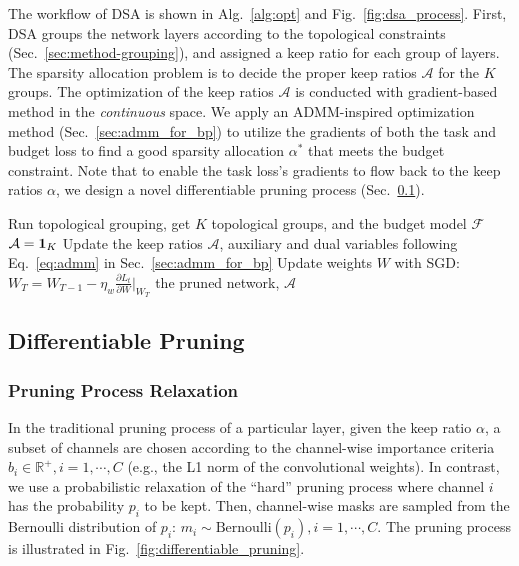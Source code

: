 \documentclass[runningheads]{llncs}
\newcommand{\flops}{\mathcal{F}}
\newcommand{\alphas}{\mathcal{A}}
\newcommand{\dsa}{DSA\xspace}
\begin{document}
  The workflow of \dsa is shown in Alg.~\ref{alg:opt} and Fig.~\ref{fig:dsa_process}. 
  First, \dsa groups the network layers according to the topological constraints (Sec.~\ref{sec:method-grouping}), and assigned a keep ratio for each group of layers. The sparsity allocation problem is to decide the proper keep ratios $\alphas$ for the $K$ groups.
  The optimization of the keep ratios $\alphas$ is conducted with gradient-based method in the \emph{continuous} space. 
  We apply an ADMM-inspired optimization method (Sec.~\ref{sec:admm_for_bp}) to utilize the gradients of both the task and budget loss to find a good sparsity allocation $\alpha^*$ that meets the budget constraint.
  Note that to enable the task loss's gradients to flow back to the keep ratios $\alpha$, we design a novel differentiable pruning process (Sec.~\ref{sec:method-pruning}).
  
  
  
  
  
  \begin{algorithm}[t]
    \begin{algorithmic}[1]
      \STATE Run topological grouping, get $K$ topological groups, and the budget model $\flops$
    \STATE $\alphas = {\bf 1}_{K}$
  \WHILE{$\flops(\alphas) > B_{\flops}$}
  \STATE Update the keep ratios $\alphas$, auxiliary and dual variables following Eq.~\ref{eq:admm} in Sec.~\ref{sec:admm_for_bp} 
  \STATE Update weights $W$ with SGD:\\ $W_{T} = W_{T-1} - \eta_w \frac{\partial L_t}{\partial W}|_{W_T}$
  \ENDWHILE
  \RETURN the pruned network, $\alphas$
  \end{algorithmic}
  \caption{\dsa: Differentiable sparsity allocation}
  \label{alg:opt}
  \end{algorithm}
  
  
  
  
  
  \subsection{Differentiable Pruning}
  \label{sec:method-pruning}
  
  \subsubsection{Pruning Process Relaxation}
  
  In the traditional pruning process of a particular layer, given the keep ratio $\alpha$, a subset of channels are chosen according to the channel-wise importance criteria $b_i \in \mathbb{R}^+, i=1,\cdots,C$ (e.g., the L1 norm of the convolutional weights).
  In contrast, we use a probabilistic relaxation of the ``hard'' pruning process where channel $i$ has the probability $p_i$ to be kept.
  Then, channel-wise masks are sampled from the Bernoulli distribution of $p_i$: $m_i \sim \mbox{Bernoulli}(p_i), i=1,\cdots,C$. The pruning process is illustrated in Fig.~\ref{fig:differentiable_pruning}.
  
\end{document}
